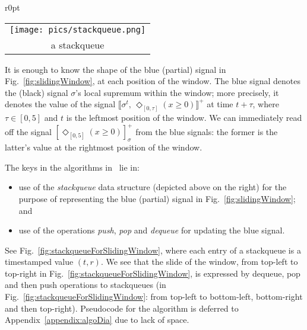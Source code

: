 \documentclass[envcountsect,orivec]{llncs} \usepackage{etex} \usepackage[]{graphicx}
\newcommand{\DiaOp}[1]{\Diamond_{#1}}
\newcommand{\Robust}[2]{{ \llbracket #1,\, #2 \rrbracket}}
\begin{document}
\begin{wrapfigure}[3]{r}{0pt}
  \begin{tabular}{c}
    \texttt{[image: pics/stackqueue.png]}
\\[-1em]
    a stackqueue
  \end{tabular} 
\end{wrapfigure}
It is enough to know the shape of the blue (partial) signal in
Fig.~\ref{fig:slidingWindow}, at each position of the window.
The blue signal denotes the (black) signal $\sigma$'s
local supremum within the window; more precisely, 
it denotes the value of the signal
$\Robust{\sigma^t}{\DiaOp{[0,\tau]}(x\ge 0)}^+$ at time $t+\tau$, where
$\tau \in [0,5]$ and $t$ is the leftmost position of the window.
We can immediately read off
the signal
$[\DiaOp{[0,5]} (x\ge 0)]^+_{\sigma}$ 
from the blue signals: 
the former is the latter's value at the
 rightmost position of the window.


The keys in 
the algorithms
in~\cite{DBLP:conf/cav/DonzeFM13,DBLP:journals/njc/Lemire06}
lie in:
\begin{itemize}
 \item use of the \emph{stackqueue} data structure (depicted above on the right) for the
purpose of representing the blue (partial) signal in
Fig.~\ref{fig:slidingWindow}; and 
 \item use of the  operations \emph{push}, \emph{pop} and
       \emph{dequeue} for updating the blue signal.
\end{itemize}
See Fig.~\ref{fig:stackqueueForSlidingWindow}, where each entry of
a stackqueue is a timestamped value $(t,r)$. We see that the slide of the window, from top-left to
top-right in Fig.~\ref{fig:stackqueueForSlidingWindow},
is expressed by dequeue, pop and then push operations to stackqueues (in
Fig.~\ref{fig:stackqueueForSlidingWindow}: from top-left to bottom-left,
bottom-right and then top-right).
 Pseudocode for the algorithm is deferred to
Appendix~\ref{appendix:algoDia} due to lack of space.
\end{document}
